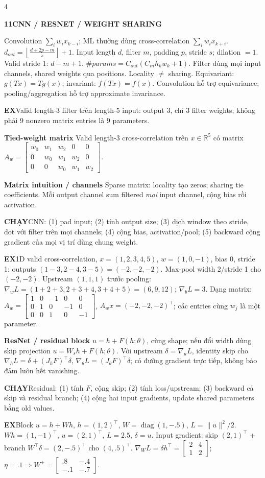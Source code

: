 \documentclass[a4paper]{article}
\newcommand{\topic}[2]{\par\addvspace{.8pt}%
  \begingroup\setlength{\fboxsep}{0.5pt}%
  \noindent\colorbox{structure}{\parbox{\dimexpr\linewidth-2\fboxsep\relax}{%
    \color{white}\fontsize{6.5}{7.1}\selectfont\bfseries #1\enspace #2}}%
  \endgroup\par\nobreak\vspace{.3pt}\nobreak}
\newcommand{\run}[1]{\key{CHẠY}#1}
\newcommand{\key}[1]{\par\textcolor{structure}{\textbf{#1}}\enspace}
\newcommand{\note}[4]{\par\begingroup\setlength{\fboxsep}{0.15pt}%
  \noindent\colorbox{#1}{\parbox{\dimexpr\linewidth-2\fboxsep\relax}{%
    \RaggedRight\textcolor{#2}{\textbf{#3}}\enspace #4}}%
  \endgroup\par}
\newcommand{\ex}[1]{\note{examplebg}{example}{EX}{#1}}
\newcommand{\R}{\mathbb{R}}
\newcommand{\norm}[1]{\lVert#1\rVert}
\newcommand{\diag}{\operatorname{diag}}
\begin{document}
\begin{multicols*}{4}
\topic{11}{CNN / RESNET / WEIGHT SHARING}
Convolution $\sum_iw_ix_{k-i}$; ML thường dùng cross-correlation $\sum_iw_ix_{k+i}$.
$d_{out}=\left\lfloor\frac{d+2p-m}{s}\right\rfloor+1.$
Input length $d$, filter $m$, padding $p$, stride $s$; dilation $=1$. Valid stride 1: $d-m+1$.
$\#params=C_{out}(C_{in}h_kw_k+1).$
Filter dùng mọi input channels, shared weights qua positions. Locality $\ne$ sharing. Equivariant: $g(Tx)=Tg(x)$; invariant: $f(Tx)=f(x)$. Convolution hỗ trợ equivariance; pooling/aggregation hỗ trợ approximate invariance.
\ex{Valid length-3 filter trên length-5 input: output 3, chỉ 3 filter weights; không phải 9 nonzero matrix entries là 9 parameters.}
\key{Tied-weight matrix}
Valid length-3 cross-correlation trên $x\in\R^5$ có matrix
$A_w=\left[\begin{smallmatrix}w_0&w_1&w_2&0&0\\0&w_0&w_1&w_2&0\\0&0&w_0&w_1&w_2\end{smallmatrix}\right].$
\key{Matrix intuition / channels}
Sparse matrix: locality tạo zeros; sharing tie coefficients. Mỗi output channel sum filtered \emph{mọi} input channel, cộng bias rồi activation.
\run{CNN: (1) pad input; (2) tính output size; (3) dịch window theo stride, dot với filter trên mọi channels; (4) cộng bias, activation/pool; (5) backward cộng gradient của mọi vị trí dùng chung weight.}
\ex{1D valid cross-correlation, $x=(1,2,3,4,5)$, $w=(1,0,-1)$, bias $0$, stride 1: outputs $(1-3,2-4,3-5)=(-2,-2,-2)$. Max-pool width 2/stride 1 cho $(-2,-2)$. Upstream $(1,1,1)$ trước pooling: $\nabla_wL=(1+2+3,2+3+4,3+4+5)=(6,9,12)$; $\nabla_bL=3$. Dạng matrix: $A_w=\left[\begin{smallmatrix}1&0&-1&0&0\\0&1&0&-1&0\\0&0&1&0&-1\end{smallmatrix}\right]$, $A_wx=(-2,-2,-2)^\top$; các entries cùng $w_j$ là một parameter.}
\key{ResNet / residual block}
$u=h+F(h;\theta)$, cùng shape; nếu đổi width dùng skip projection $u=W_sh+F(h;\theta)$.
Với upstream $\delta=\nabla_uL$, identity skip cho $\nabla_hL=\delta+(J_hF)^\top\delta$, $\nabla_\theta L=(J_\theta F)^\top\delta$; có đường gradient trực tiếp, không bảo đảm luôn hết vanishing.
\run{Residual: (1) tính $F$, cộng skip; (2) tính loss/upstream; (3) backward cả skip và residual branch; (4) cộng hai input gradients, update shared parameters bằng old values.}
\ex{Block $u=h+Wh$, $h=(1,2)^\top$, $W=\diag(1,-.5)$, $L=\norm u^2/2$. $Wh=(1,-1)^\top$, $u=(2,1)^\top$, $L=2.5$, $\delta=u$. Input gradient: skip $(2,1)^\top$ + branch $W^\top\delta=(2,-.5)^\top$ cho $(4,.5)^\top$. $\nabla_WL=\delta h^\top=\left[\begin{smallmatrix}2&4\\1&2\end{smallmatrix}\right]$; $\eta=.1\Rightarrow W^+=\left[\begin{smallmatrix}.8&-.4\\-.1&-.7\end{smallmatrix}\right]$.}


\end{multicols*}
\end{document}
